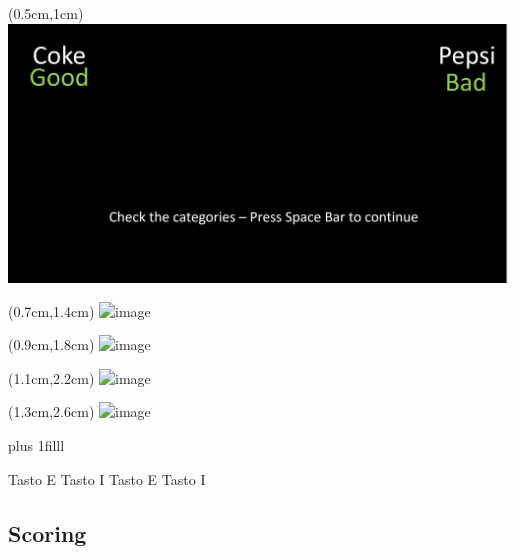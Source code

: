 \documentclass[compress]{beamer}
\begin{document}
\begin{frame}
	\begin{textblock*}{10cm}(0.5cm,1cm)
		{\includegraphics[width=\linewidth]{cokeIAT1.png}}
	\end{textblock*}
	\begin{textblock*}{10cm}(0.7cm,1.4cm)
		{\includegraphics<2->[width=\linewidth]{cokeIAT2.png}}
	\end{textblock*}
	\begin{textblock*}{10cm}(0.9cm,1.8cm)
		{\includegraphics<3->[width=\linewidth]{cokeIAT3.png}}
	\end{textblock*}
	\begin{textblock*}{10cm}(1.1cm,2.2cm)
		{\includegraphics<4->[width=\linewidth]{cokeIAT4.png}}
	\end{textblock*}
	\begin{textblock*}{10cm}(1.3cm,2.6cm)
		{\includegraphics<5->[width=\linewidth]{cokeIAT5.png}}
	\end{textblock*}
	
	\vskip0pt plus 1filll
	
	 Tasto E
	\onslide<3-3> Tasto I
	\onslide<4-4> Tasto E
	\onslide<5-5> Tasto I
	
\end{frame}

\subsection*{Scoring}
\end{document}
